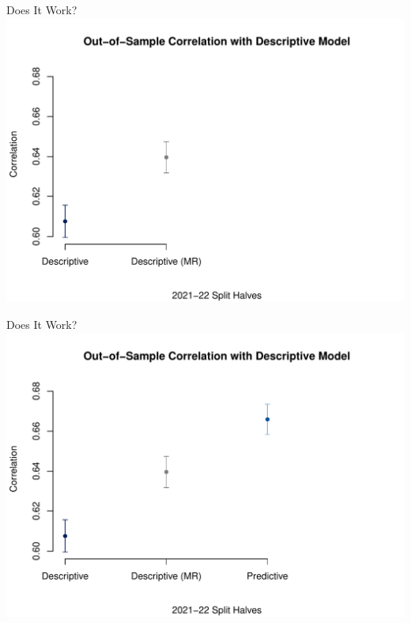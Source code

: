 \documentclass{beamer}
\begin{document}
  \begin{frame}{Does It Work?}
    \centering
    \includegraphics[width = \textwidth]{images/cor_overall_2.pdf}
  \end{frame}

  \begin{frame}{Does It Work?}
    \centering
    \includegraphics[width = \textwidth]{images/cor_overall_3.pdf}
  \end{frame}
\end{document}
